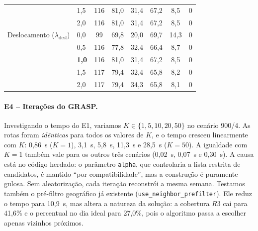 \documentclass[11pt,a4paper]{article}
\begin{document}
\begin{table}[ht]
\begin{tabular}{@{}llcccccc@{}}
 & 1,5 & 116 & 81,0 & 31,4 & 67,2 & 8,5 & 0 \\
 & 2,0 & 116 & 81,0 & 31,4 & 67,2 & 8,5 & 0 \\
\midrule
Deslocamento ($\lambda_{\text{desl}}$) & 0,0 & 99 & 69,8 & 20,0 & 69,7 & 14,3 & 0 \\
 & 0,5 & 116 & 77,8 & 32,4 & 66,4 & 8,7 & 0 \\
 & \textbf{1,0} & 116 & 81,0 & 31,4 & 67,2 & 8,5 & 0 \\
 & 1,5 & 117 & 79,4 & 32,4 & 65,8 & 8,2 & 0 \\
 & 2,0 & 117 & 79,4 & 34,3 & 65,8 & 8,1 & 0 \\ \bottomrule
\end{tabular}
\end{table}

\paragraph{E4 -- Iterações do GRASP.} Investigando o tempo do E1, variamos $K \in \{1, 5, 10, 20, 50\}$ no cenário 900/4. As rotas foram \emph{idênticas} para todos os valores de $K$, e o tempo cresceu linearmente com $K$: 0,86~s ($K{=}1$), 3,1~s, 5,8~s, 11,3~s e 28,5~s ($K{=}50$). A igualdade com $K{=}1$ também vale para os outros três cenários (0,02~s, 0,07~s e 0,30~s). A causa está no código herdado: o parâmetro \texttt{alpha}, que controlaria a lista restrita de candidatos, é mantido ``por compatibilidade'', mas a construção é puramente gulosa. Sem aleatorização, cada iteração reconstrói a mesma semana. Testamos também o pré-filtro geográfico já existente (\texttt{use\_neighbor\_prefilter}). Ele reduz o tempo para 10,9~s, mas altera a natureza da solução: a cobertura $R3$ cai para 41,6\% e o percentual no dia ideal para 27,0\%, pois o algoritmo passa a escolher apenas vizinhos próximos.
\end{document}
